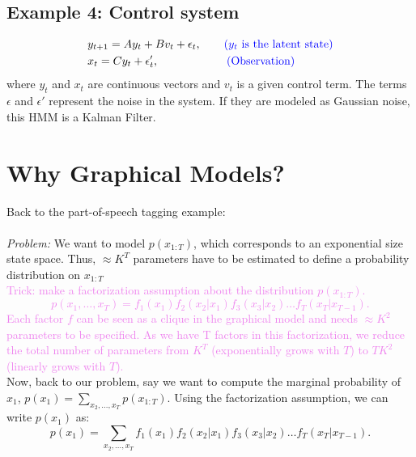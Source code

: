 \documentclass[12pt]{report}
\begin{document}
\subsection{Example 4: Control system}
\begin{equation*}
\begin{split}
&y_{t+1} = A y_t + B v_t + \epsilon_t, \qquad \textcolor{blue}{\text{($y_t$ is the latent state)}} \\
& x_t = C y_t + \epsilon'_{t}, \qquad \qquad \qquad \textcolor{blue}{\text{(Observation)}}
\end{split}
\end{equation*}
where $y_t$ and $x_t$ are continuous vectors and $v_t$ is a given control term. The terms $\epsilon$ and $\epsilon'$ represent the noise in the system. If they are modeled as Gaussian noise, this HMM is a Kalman Filter. \\

\section{Why Graphical Models?}
Back to the part-of-speech tagging example: \\

\noindent{}
\\ 
\newline \textit{Problem:} We want to model $p(x_{1:T})$, which corresponds to an exponential size state space. Thus, $\approx K^T$ parameters have to be estimated to define a probability distribution on $x_{1:T}$ \\
\newline \textcolor{violet}{Trick: make a factorization assumption about the distribution $p(x_{1:T})$.
\begin{equation*}
p(x_1, \ldots, x_T) = f_1(x_1)f_2(x_2|x_1)f_3(x_3|x_2) \ldots f_T(x_T|x_{T-1}).
\end{equation*}
Each factor $f$ can be seen as a clique in the graphical model and needs $\approx K^2$ parameters to be specified. As we have T factors in this factorization, we reduce the total number of parameters from $K^T$ (exponentially grows with $T$) to $TK^2$ (linearly grows with $T$).
} \\
\newline Now, back to our problem, say we want to compute the marginal probability of $x_1$, $p(x_1) = \displaystyle\sum_{x_2, \ldots, x_T} p(x_{1:T})$. Using the factorization assumption, we can write $p(x_1)$ as:
\begin{equation}
\label{factorization}
p(x_1) = \sum_{x_2, \ldots, x_T} f_1(x_1)f_2(x_2|x_1)f_3(x_3|x_2) \ldots f_T(x_T|x_{T-1}).
\end{equation}
\end{document}
